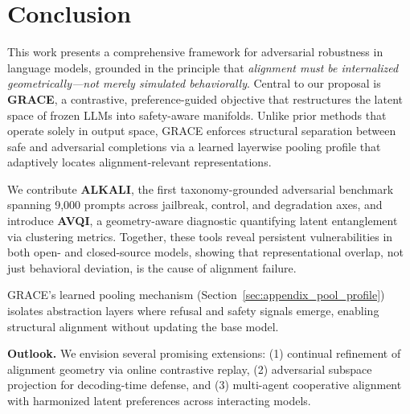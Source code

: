 \section{Conclusion}


This work presents a comprehensive framework for adversarial robustness in language models, grounded in the principle that \emph{alignment must be internalized geometrically—not merely simulated behaviorally}. Central to our proposal is \textbf{GRACE}, a contrastive, preference-guided objective that restructures the latent space of frozen LLMs into safety-aware manifolds. Unlike prior methods that operate solely in output space, GRACE enforces structural separation between safe and adversarial completions via a learned layerwise pooling profile that adaptively locates alignment-relevant representations.

We contribute \textbf{ALKALI}, the first taxonomy-grounded adversarial benchmark spanning 9,000 prompts across jailbreak, control, and degradation axes, and introduce \textbf{AVQI}, a geometry-aware diagnostic quantifying latent entanglement via clustering metrics. Together, these tools reveal persistent vulnerabilities in both open- and closed-source models, showing that representational overlap, not just behavioral deviation, is the cause of alignment failure.



GRACE’s learned pooling mechanism (Section~\ref{sec:appendix_pool_profile}) isolates abstraction layers where refusal and safety signals emerge, enabling structural alignment without updating the base model. 

\textbf{Outlook.} We envision several promising extensions: (1) continual refinement of alignment geometry via online contrastive replay, (2) adversarial subspace projection for decoding-time defense, and (3) multi-agent cooperative alignment with harmonized latent preferences across interacting models.














